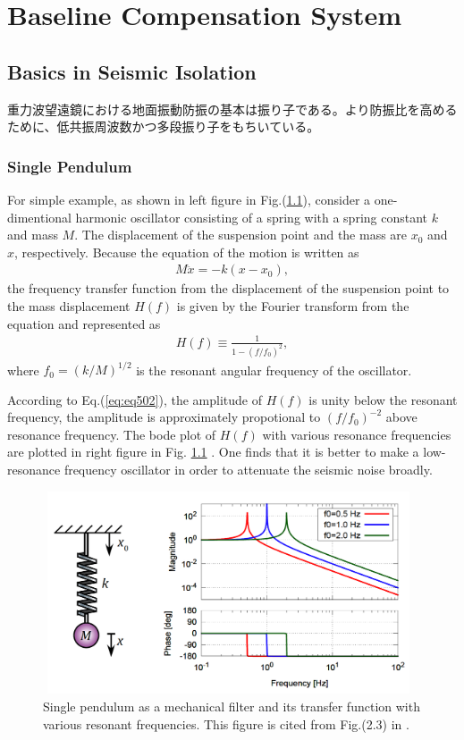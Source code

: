 \chapter{Baseline Compensation System}


\section{Basics in Seismic Isolation}\label{sec:51}
重力波望遠鏡における地面振動防振の基本は振り子である。より防振比を高めるために、低共振周波数かつ多段振り子をもちいている。


\subsection{Single Pendulum}
For simple example, as shown in left figure in Fig.(\ref{img:img501}), consider a one-dimentional harmonic oscillator consisting of a spring with a spring constant $k$ and mass $M$. The displacement of the suspension point and the mass are $x_0$ and $x$, respectively. Because the equation of the motion is written as
\begin{eqnarray} \label{eq:eq501}
  M\ddot{x} = -k(x-x_0),
\end{eqnarray}
the frequency transfer function from the displacement of the suspension point to the mass displacement $H(f)$ is given by the Fourier transform from the equation and represented as
\begin{eqnarray} \label{eq:eq502}
  H(f) \equiv \frac{1}{1-(f/f_0)^2},
\end{eqnarray}
where $f_0 = (k/M)^{1/2}$ is the resonant angular frequency of the oscillator.

According to Eq.(\ref{eq:eq502}), the amplitude of $H(f)$ is unity below the resonant frequency, the amplitude is approximately propotional to $(f/f_0)^{-2}$ above resonance frequency. The bode plot of $H(f)$ with various resonance frequencies are plotted in right figure in Fig. \ref{img:img501} . One finds that it is better to make a low-resonance frequency oscillator in order to attenuate the seismic noise broadly. 

\begin{figure}[h]
  \begin{center}   
    \includegraphics[width=11cm,height=6cm]{./img_chap5/img501.png}
    \caption{Single pendulum as a mechanical filter and its transfer function with various resonant frequencies. This figure is cited from Fig.(2.3) in \cite{sekiguchi2016astudy}.} \label{img:img501}
  \end{center}
\end{figure}


